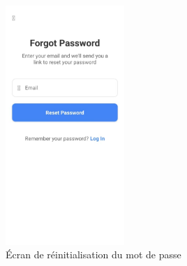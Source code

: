 \begin{figure}[H]
    \centering
    \includegraphics[width=0.4\textwidth]{assets/docs/mobile/forget-password-page.jpeg}
    \caption{Écran de réinitialisation du mot de passe}
    \label{fig:mobile-forgot-password}
\end{figure}


